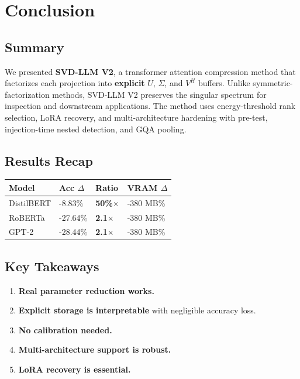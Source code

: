 
\section{Conclusion}

\subsection{Summary}

We presented \textbf{SVD-LLM V2}, a transformer attention compression method that 
factorizes each projection into \textbf{explicit} $U$, $\Sigma$, and $V^H$ 
buffers. Unlike symmetric-factorization methods, SVD-LLM V2 preserves the 
singular spectrum for inspection and downstream applications. The method 
uses energy-threshold rank selection, LoRA recovery, and multi-architecture 
hardening with pre-test, injection-time nested detection, and GQA pooling.

\subsection{Results Recap}

\begin{table}[H]
\centering
\small
\begin{tabular}{llll}
\toprule
\textbf{Model} & \textbf{Acc $\Delta$} & \textbf{Ratio} & \textbf{VRAM $\Delta$} \\
\midrule
DistilBERT & -8.83\% & \textbf{50\%$\times$} & -380 MB\% \\
RoBERTa & -27.64\% & \textbf{2.1$\times$} & -380 MB\% \\
GPT-2 & -28.44\% & \textbf{2.1$\times$} & -380 MB\% \\
\bottomrule
\end{tabular}
\end{table}

\subsection{Key Takeaways}

\begin{enumerate}
\item \textbf{Real parameter reduction works.}
\item \textbf{Explicit storage is interpretable} with negligible accuracy loss.
\item \textbf{No calibration needed.}
\item \textbf{Multi-architecture support is robust.}
\item \textbf{LoRA recovery is essential.}

\end{enumerate}
